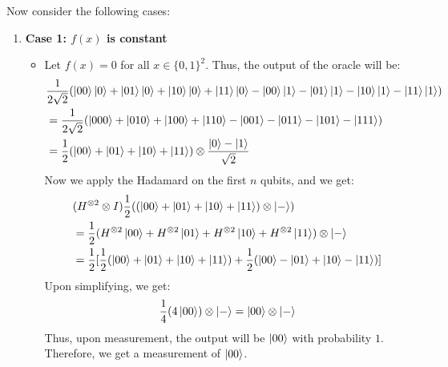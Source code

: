 \begin{example}
    Now consider the following cases:
\begin{enumerate}
    \item \textbf{Case 1: $f(x)$ is constant}\\
    \begin{itemize}
        \item Let $f(x)=0$ for all $x \in \{0,1\}^2$. Thus, the output of the oracle will be:
        \begin{align*}
            &\frac{1}{2\sqrt{2}}(\ket{00}\ket{0}+\ket{01}\ket{0}+\ket{10}\ket{0}+\ket{11}\ket{0}-\ket{00}\ket{1}-\ket{01}\ket{1}-\ket{10}\ket{1}-\ket{11}\ket{1})\\
            &=\frac{1}{2\sqrt{2}}(\ket{000}+\ket{010}+\ket{100}+\ket{110}-\ket{001}-\ket{011}-\ket{101}-\ket{111})\\
            &=\frac{1}{2}(\ket{00}+\ket{01}+\ket{10}+\ket{11})\otimes \frac{\ket{0}-\ket{1}}{\sqrt{2}}
        \end{align*}
        Now we apply the Hadamard on the first $n$ qubits, and we get:
        \begin{align*}
            &(H^{\otimes 2}\otimes I)\frac{1}{2}((\ket{00}+\ket{01}+\ket{10}+\ket{11})\otimes \ket{-})\\
            &=\frac{1}{2}(H^{\otimes 2}\ket{00}+H^{\otimes 2}\ket{01}+H^{\otimes 2}\ket{10}+H^{\otimes 2}\ket{11})\otimes \ket{-}\\
            &=\frac{1}{2}[\frac{1}{2}(\ket{00}+\ket{01}+\ket{10}+\ket{11})+\frac{1}{2}(\ket{00}-\ket{01}+\ket{10}-\ket{11})]
        \end{align*}
        Upon simplifying, we get:
        \[
            \frac{1}{4}(4\ket{00})\otimes \ket{-}=\ket{00}\otimes \ket{-}
        \]
        Thus, upon measurement, the output will be $\ket{00}$ with probability $1$. Therefore, we get a measurement of $\ket{00}$.


\end{itemize}
\end{enumerate}
\end{example}
